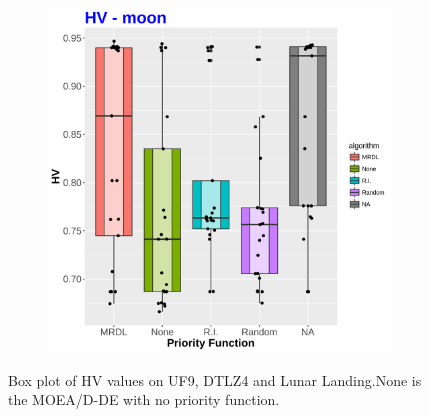 \begin{figure}[!t]
\begin{subfigure}[b]{0.33\textwidth}
	\end{subfigure}
\begin{subfigure}[b]{0.33\textwidth}
	\centering
	\includegraphics[width=1\textwidth, height=0.77\textwidth]{images/moon_HV}
\end{subfigure}
	\caption{Box plot of HV values on UF9, DTLZ4 and Lunar Landing.None is the MOEA/D-DE with no priority function.}
		\label{HVS}
\end{figure}


